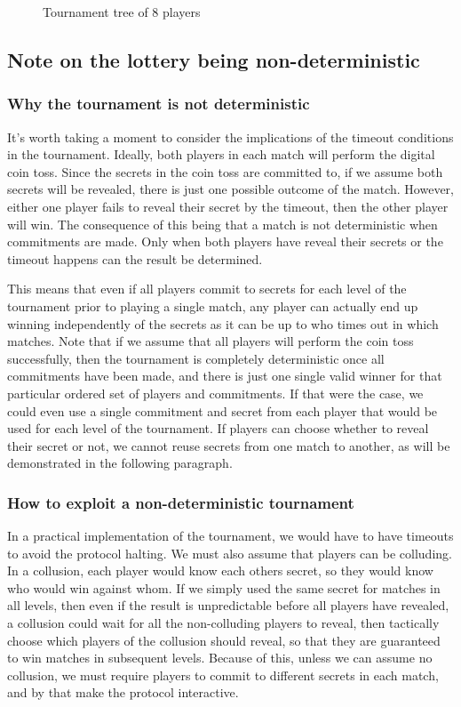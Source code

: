 \begin{figure}[htbp]
  \centering
  
  \caption{Tournament tree of 8 players}
\end{figure}

\subsection{Note on the lottery being non-deterministic}

\subsubsection{Why the tournament is not deterministic}  %
It's worth taking a moment to consider the implications of the timeout conditions in the tournament. Ideally, both players in each match will perform the digital coin toss. Since the secrets in the coin toss are committed to, if we assume both secrets will be revealed, there is just one possible outcome of the match. However, either one player fails to reveal their secret by the timeout, then the other player will win. The consequence of this being that a match is not deterministic when commitments are made. Only when both players have reveal their secrets or the timeout happens can the result be determined. 

This means that even if all players commit to secrets for each level of the tournament prior to playing a single match, any player can actually end up winning independently of the secrets as it can be up to who times out in which matches. Note that if we assume that all players will perform the coin toss successfully, then the tournament is completely deterministic once all commitments have been made, and there is just one single valid winner for that particular ordered set of players and commitments. If that were the case, we could even use a single commitment and secret from each player that would be used for each level of the tournament. If players can choose whether to reveal their secret or not, we cannot reuse secrets from one match to another, as will be demonstrated in the following paragraph.

\subsubsection{How to exploit a non-deterministic tournament}  %
In a practical implementation of the tournament, we would have to have timeouts to avoid the protocol halting. We must also assume that players can be colluding. In a collusion, each player would know each others secret, so they would know who would win against whom. If we simply used the same secret for matches in all levels, then even if the result is unpredictable before all players have revealed, a collusion could wait for all the non-colluding players to reveal, then tactically choose which players of the collusion should reveal, so that they are guaranteed to win matches in subsequent levels. Because of this, unless we can assume no collusion, we must require players to commit to different secrets in each match, and by that make the protocol interactive.

